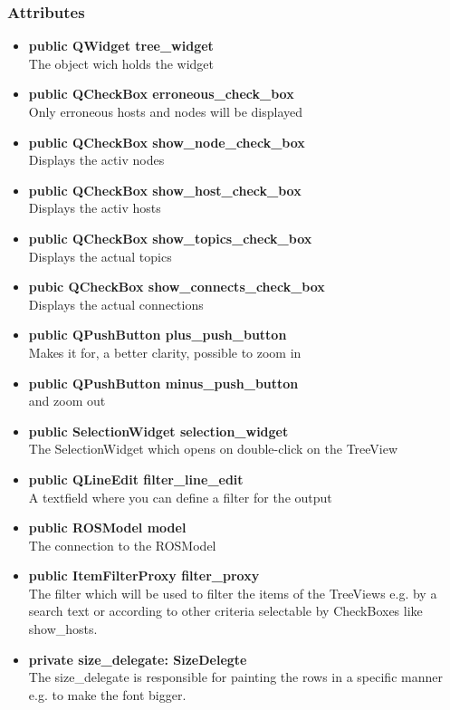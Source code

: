 \subsubsection{Attributes}
\begin{itemize}
  \item \textbf{public QWidget tree\_widget}\\
  The object wich holds the widget
  \item \textbf{public QCheckBox erroneous\_check\_box}\\
  Only erroneous hosts and nodes will be displayed
  \item \textbf{public QCheckBox show\_node\_check\_box}\\
  Displays the activ nodes
  \item \textbf{public QCheckBox show\_host\_check\_box}\\
  Displays the activ hosts
  \item \textbf{public QCheckBox show\_topics\_check\_box}\\
  Displays the actual topics
  \item \textbf{pubic QCheckBox show\_connects\_check\_box}\\
  Displays the actual connections
  \item \textbf{public QPushButton plus\_push\_button}\\
  Makes it for, a better clarity, possible to zoom in  
  \item \textbf{public QPushButton minus\_push\_button}\\
  and zoom out
  \item \textbf{public SelectionWidget selection\_widget}\\
  The SelectionWidget which opens on double-click on the TreeView
  \item \textbf{public QLineEdit filter\_line\_edit}\\
  A textfield where you can define a filter for the output
  \item \textbf{public ROSModel model}\\
  The connection to the ROSModel
  \item \textbf{public ItemFilterProxy filter\_proxy}\\
  The filter which will be used to filter the items of the TreeViews e.g. by a search text or according to other criteria selectable by CheckBoxes like show\_hosts.
  \item \textbf{private size\_delegate: SizeDelegte}\\
  The size\_delegate is responsible for painting the rows in a specific manner e.g. to make the font bigger.
  
\end{itemize}
